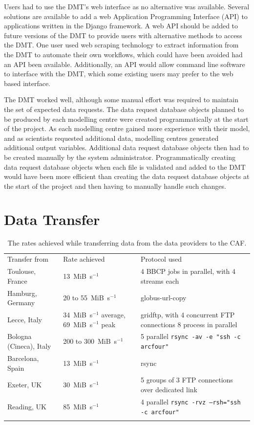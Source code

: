 \documentclass[gmd, manuscript]{copernicus}
\begin{document}
Users had to use the DMT's web interface as no alternative was available. Several solutions are available to add a web Application Programming Interface (API) to applications written in the Django framework. A web API should be added to future versions of the DMT to provide users with alternative methods to access the DMT. One user used web scraping technology to extract information from the DMT to automate their own workflows, which could have been avoided had an API been available. Additionally, an API would allow command line software to interface with the DMT, which some existing users may prefer to the web based interface.

The DMT worked well, although some manual effort was required to maintain the set of expected data requests. The data request database objects planned to be produced by each modelling centre were created programmatically at the start of the project. As each modelling centre gained more experience with their model, and as scientists requested additional data, modelling centres generated additional output variables.  Additional data request database objects then had to be created manually by the system administrator. Programmatically creating data request database objects when each file is validated and added to the DMT would have been more efficient than creating the data request database objects at the start of the project and then having to manually handle such changes.

\section{Data Transfer}
\label{transfer_rates}

\begin{table}[ht]
	\caption{The rates achieved while transferring data from the data providers to the CAF.}
	\begin{tabular}{lll}
		\tophline
		Transfer from & Rate achieved & Protocol used \\
		\middlehline
		Toulouse, France & 13~MiB~s$^{-1}$ & 4 BBCP jobs in parallel, with 4 streams each \\
		Hamburg, Germany & 20 to 55~MiB~s$^{-1}$ & globus-url-copy \\
		Lecce, Italy & 34~MiB~s$^{-1}$ average, 69~MiB~s$^{-1}$ peak & gridftp, with 4 concurrent FTP connections 8 process in parallel \\
		Bologna (Cineca), Italy & 200 to 300~MiB~s$^{-1}$ & 5 parallel \texttt{rsync -av -e "ssh -c arcfour"} \\
		Barcelona, Spain & 13~MiB~s$^{-1}$ & rsync \\
		Exeter, UK & 30~MiB~s$^{-1}$ & 5 groups of 3 FTP connections over dedicated link \\
		Reading, UK & 85~MiB~s$^{-1}$ & 4 parallel \texttt{rsync -rvz --rsh="ssh -c arcfour"} \\
		\bottomhline
	\end{tabular}
	\belowtable{} %
	\label{rates_achieved}
\end{table}
\end{document}
